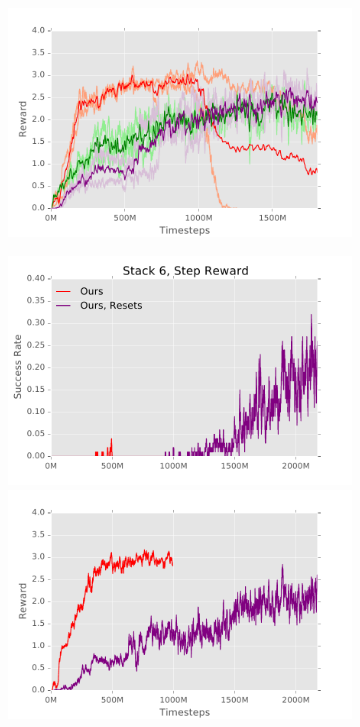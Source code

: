 \documentclass[letterpaper, 10 pt, conference]{ieeeconf}  %
\begin{document}
\begin{figure}[t]
\begin{subfigure}{0.3\linewidth}
        \includegraphics[width=1.0\linewidth]{figs/5_reward}
    \end{subfigure}
    \begin{subfigure}{0.3\linewidth}
        \includegraphics[width=1.0\linewidth]{figs/6_success}
        \includegraphics[width=1.0\linewidth]{figs/6_reward}
    \end{subfigure}
    

\end{figure}
\end{document}
